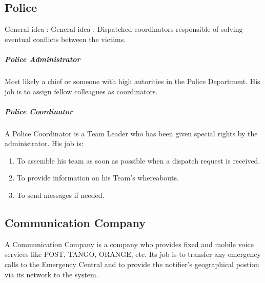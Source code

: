 \subsection{Police}
General idea : General idea : Dispatched coordinators responsible of solving
eventual conflicts between the victims.

\subparagraph{Police Administrator}
Most likely a chief or someone with high autorities in the Police Department.
His job is to assign fellow colleagues as coordinators.

\subparagraph{Police Coordinator}
A Police Coordinator is a Team Leader who has been given special
rights by the administrator. His job is:

\begin{enumerate}
\item To assemble his team as soon as possible when a dispatch request is
received.
\item To provide information on his Team's whereabouts.
\item To send messages if needed.
\end{enumerate}


\subsection{Communication Company}
A Communication Company is a company who provides fixed and mobile voice
services like POST, TANGO, ORANGE, etc. Its job is to transfer any emergency
calls to the Emergency Central and to provide the notifier's
geographical postion via its network to the system.

\newpage
